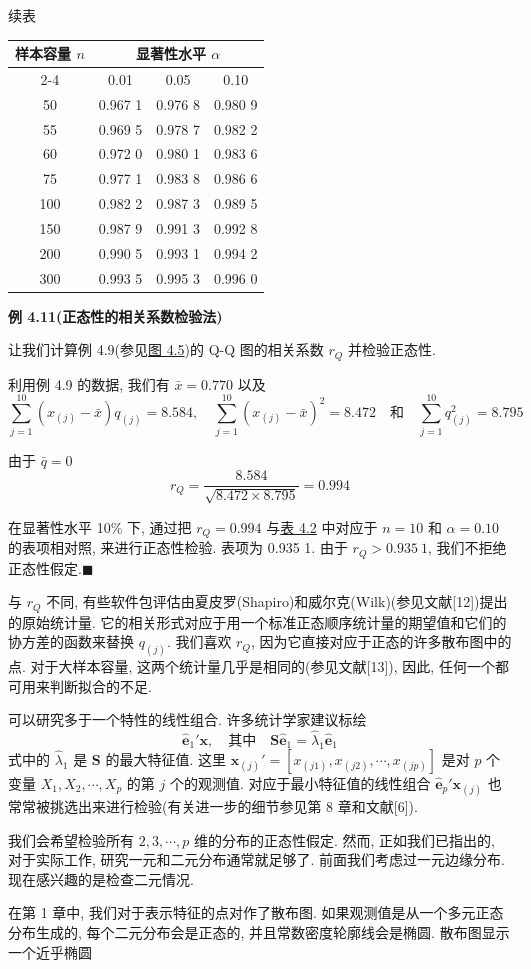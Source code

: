 \begin{mvtable}
\centering
{续表\par}\vspace{2pt}
\begin{tabular}{cccc}
\toprule
\multirow{2}{*}{样本容量 $n$} & \multicolumn{3}{c}{显著性水平 $\alpha$} \\
\cmidrule(lr){2-4}
 & 0.01 & 0.05 & 0.10 \\
\midrule
50 & 0.967 1 & 0.976 8 & 0.980 9 \\
55 & 0.969 5 & 0.978 7 & 0.982 2 \\
60 & 0.972 0 & 0.980 1 & 0.983 6 \\
75 & 0.977 1 & 0.983 8 & 0.986 6 \\
100 & 0.982 2 & 0.987 3 & 0.989 5 \\
150 & 0.987 9 & 0.991 3 & 0.992 8 \\
200 & 0.990 5 & 0.993 1 & 0.994 2 \\
300 & 0.993 5 & 0.995 3 & 0.996 0 \\
\bottomrule
\end{tabular}
\end{mvtable}

\noindent\textbf{例 4.11}\quad \textbf{(正态性的相关系数检验法)}

让我们计算例 4.9(参见\hyperref[fig:4.5]{图 4.5})的 Q-Q 图的相关系数 $r_{Q}$ 并检验正态性.

利用例 4.9 的数据, 我们有 $\bar{x}=0.770$ 以及
\[
\sum_{j=1}^{10}(x_{(j)}-\bar{x})q_{(j)}=8.584,\quad \sum_{j=1}^{10}(x_{(j)}-\bar{x})^{2}=8.472\quad\text{和}\quad \sum_{j=1}^{10}q_{(j)}^{2}=8.795
\]

由于 $\bar{q}=0$
\[
r_{Q}=\frac{8.584}{\sqrt{8.472\times 8.795}}=0.994
\]

在显著性水平 10\% 下, 通过把 $r_{Q}=0.994$ 与\hyperref[tab:4.2]{表 4.2} 中对应于 $n=10$ 和 $\alpha=0.10$ 的表项相对照, 来进行正态性检验. 表项为 0.935 1. 由于 $r_{Q}>0.935\ 1$, 我们不拒绝正态性假定.\hfill$\blacksquare$

与 $r_{Q}$ 不同, 有些软件包评估由夏皮罗(Shapiro)和威尔克(Wilk)(参见文献[12])提出的原始统计量. 它的相关形式对应于用一个标准正态顺序统计量的期望值和它们的协方差的函数来替换 $q_{(j)}$. 我们喜欢 $r_{Q}$, 因为它直接对应于正态的许多散布图中的点. 对于大样本容量, 这两个统计量几乎是相同的(参见文献[13]), 因此, 任何一个都可用来判断拟合的不足.

可以研究多于一个特性的线性组合. 许多统计学家建议标绘
\[
\hat{\mathbf{e}}_{1}'\mathbf{x},\quad \text{其中}\quad \mathbf{S}\hat{\mathbf{e}}_{1}=\hat{\lambda}_{1}\hat{\mathbf{e}}_{1}
\]
式中的 $\hat{\lambda}_{1}$ 是 $\mathbf{S}$ 的最大特征值. 这里 $\mathbf{x}_{(j)}'=[x_{(j1)},x_{(j2)},\cdots,x_{(jp)}]$ 是对 $p$ 个变量 $X_{1},X_{2},\cdots,X_{p}$ 的第 $j$ 个的观测值. 对应于最小特征值的线性组合 $\hat{\mathbf{e}}_{p}'\mathbf{x}_{(j)}$ 也常常被挑选出来进行检验(有关进一步的细节参见第 8 章和文献[6]).


我们会希望检验所有 $2,3,\cdots,p$ 维的分布的正态性假定. 然而, 正如我们已指出的, 对于实际工作, 研究一元和二元分布通常就足够了. 前面我们考虑过一元边缘分布. 现在感兴趣的是检查二元情况.

在第 1 章中, 我们对于表示特征的点对作了散布图. 如果观测值是从一个多元正态分布生成的, 每个二元分布会是正态的, 并且常数密度轮廓线会是椭圆. 散布图显示一个近乎椭圆
